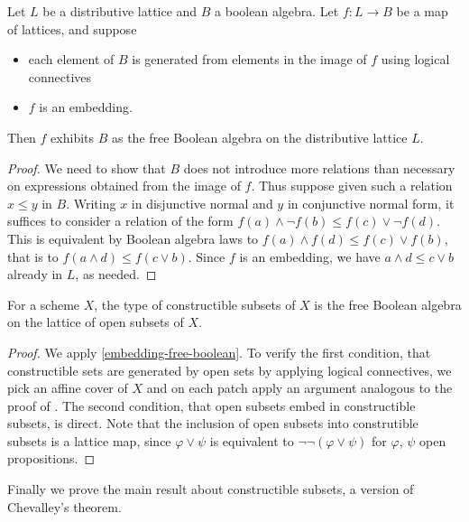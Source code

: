 \begin{lemma}\label{embedding-free-boolean}
  Let $L$ be a distributive lattice and $B$ a boolean algebra. Let $f : L \to B$ be a map of
  lattices, and suppose
  \begin{itemize}
  \item each element of $B$ is generated from elements in the image of $f$ using logical connectives
  \item $f$ is an embedding.
  \end{itemize}
  Then $f$ exhibits $B$ as the free Boolean algebra on the distributive lattice $L$.
  \end{lemma}
\begin{proof}
  We need to show that $B$ does not introduce more relations than necessary on expressions
  obtained from the image of $f$.
  Thus suppose given such a relation $x \le y$ in $B$. Writing $x$ in disjunctive normal and $y$ in conjunctive
  normal form, it suffices to consider a relation of the form
  $f(a) \wedge \neg f(b) \le f(c) \vee \neg f(d)$.
  This is equivalent by Boolean algebra laws to $f(a) \wedge f(d) \le f(c) \vee f(b)$, that is
  to $f(a \wedge d) \le f(c \vee b)$. Since $f$ is an embedding, we have $a \wedge d \le c \vee b$ already in $L$,
  as needed.
\end{proof}

\begin{theorem}\label{constructible-free-boolean}
  For a scheme $X$, the type of constructible subsets of $X$ is the free Boolean algebra on the lattice
  of open subsets of $X$.
\end{theorem}
\begin{proof}
  We apply \cref{embedding-free-boolean}. To verify the first condition, that constructible
  sets are generated by open sets by applying logical connectives, we pick an affine cover of
  $X$ and on each patch apply an argument analogous to the proof of
  \cite[Theorem 4.2.7]{draft}.
  The second condition, that open subsets embed in constructible subsets, is direct.
  Note that the inclusion of open subsets into construtible subsets is a lattice map,
  since $\varphi \vee \psi$ is equivalent to $\neg \neg (\varphi \vee \psi)$ for
  $\varphi$, $\psi$ open propositions.
\end{proof}

Finally we prove the main result about constructible subsets, a version of Chevalley's theorem.

